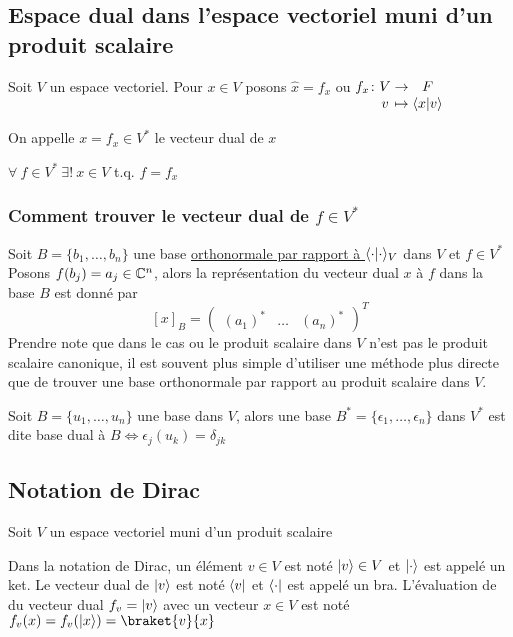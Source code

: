 \subsection{Espace dual dans l'espace vectoriel muni d'un produit scalaire}
Soit $V$ un espace vectoriel. Pour $x \in V$ posons $\hat{x} = f_x$ ou $\myfunc{f_x}{V}{F}{v}{\scpr{x}{v}}$
\begin{definition}
    On appelle $x = f_x \in V^*$ le vecteur dual de $x$
\end{definition}
\begin{theorem}
    $\forall \ f \in V^* \ \exists! \ x \in V$ t.q. $f = f_x$
\end{theorem}
\subsubsection{Comment trouver le vecteur dual de \texorpdfstring{$f \in V^*$}{f in V star}}
Soit $B = \{b_1, \dots, b_n\}$ une base \underline{orthonormale par rapport à $\langle \cdot \lvert \cdot \rangle_V$} dans $V$ et $f \in V^*$ \\
Posons $f(b_j) = a_j \in \mathbb{C}^n$, alors la représentation du vecteur dual $x$ à $f$ dans la base $B$ est donné par 
\[
[x]_B = \begin{pmatrix} (a_1)^* & \dots & (a_n)^* \end{pmatrix}^T 
\]
Prendre note que dans le cas ou le produit scalaire
dans $V$ n'est pas le produit scalaire canonique, il est souvent plus simple d'utiliser une 
méthode plus directe que de trouver une base orthonormale par rapport au produit scalaire dans $V$.
\begin{definition}
    Soit $B = \{u_1, \dots, u_n\}$ une base dans $V$, alors 
    une base $B^* = \{\epsilon_1, \dots, \epsilon_n\}$ dans $V^*$ est dite base dual à 
    $B \iff \epsilon_j(u_k) = \delta_{jk}$ 
\end{definition}
\subsection{Notation de Dirac}
Soit $V$ un espace vectoriel muni d'un produit scalaire
\begin{definition}
    Dans la notation de Dirac, un élément $v \in V$ est noté $\lvert v\rangle \in V$ et $\lvert\cdot\rangle$ est appelé un ket. 
    Le vecteur dual de $\lvert v\rangle$ est noté $\langle v\rvert$ et $\langle\cdot\rvert$ est appelé un bra. L'évaluation de 
    du vecteur dual $f_v = \lvert v\rangle$ avec un vecteur $x \in V$ est noté $f_v(x) = f_v(\ket{x}) = \braket{v}{x}$
\end{definition}